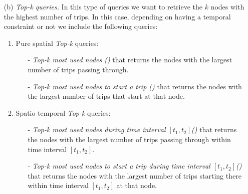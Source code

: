 \begin{itemize} [leftmargin=6mm]
\begin{enumerate}[leftmargin=3mm]
	\end{enumerate}
	
	\setlength{\itemindent}{0mm}
	\item[(b)] {\em Top-k queries.} In this type of queries we want to retrieve the $k$ nodes with the highest number of trips. In this case, depending on having a temporal constraint or not we include the following queries:
	\begin{enumerate}
		[leftmargin=3mm]
		\setlength{\itemindent}{0mm}
		\item Pure spatial {\em Top-k} queries:
		\begin{itemize}	[leftmargin=3mm]
			\setlength{\itemindent}{0mm}
			\item[-] {\em Top-k most used nodes (\Stk)} that returns the nodes with the largest number of trips passing through. %
			\item[-] {\em Top-k most used nodes to start a trip (\Stks)} that returns the nodes with the largest number of trips that start at that node.
			\medskip
		\end{itemize}
		
		\item Spatio-temporal {\em Top-k}  queries:
		\begin{itemize}[leftmargin=3mm]
			\setlength{\itemindent}{0mm}
			\item[-] {\em Top-k most used nodes during time interval $[t_1,t_2]$(\STtk)} that returns the nodes with the largest number of trips passing through within time interval $[t_1,t_2]$. 
			\item[-] {\em Top-k most used nodes to start a trip during time interval $[t_1,t_2]$(\STtks)} that returns the nodes with the largest number of trips starting there within time interval $[t_1,t_2]$ at that node.
		\end{itemize}
		
	\end{enumerate}
\end{itemize}


